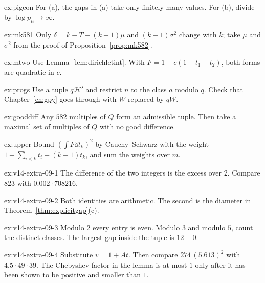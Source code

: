 \begin{hint}{ex:pigeon}
For (a), the gaps in (a) take only finitely many values. For (b), divide by $\log p_n\to\infty$.
\end{hint}

\begin{hint}{ex:mk581}
Only $\delta=k-T-(k-1)\mu$ and $(k-1)\sigma^2$ change with $k$; take $\mu$ and $\sigma^2$ from the proof of Proposition~\ref{prop:mk582}.
\end{hint}

\begin{hint}{ex:mtwo}
Use Lemma~\ref{lem:dirichletint}. With $F=1+c(1-t_1-t_2)$, both forms are quadratic in $c$.
\end{hint}

\begin{hint}{ex:progs}
Use a tuple $q\mathcal H'$ and restrict $n$ to the class $a$ modulo $q$. Check that Chapter~\ref{ch:gpy} goes through with $W$ replaced by $qW$.
\end{hint}

\begin{hint}{ex:gooddiff}
Any $582$ multiples of $Q$ form an admissible tuple. Then take a maximal set of multiples of $Q$ with no good difference.
\end{hint}

\begin{hint}{ex:upper}
Bound $(\int F\dd t_k)^2$ by Cauchy--Schwarz with the weight $1-\sum_{i<k}t_i+(k-1)t_k$, and sum the weights over $m$.
\end{hint}

\begin{hint}{ex:v14-extra-09-1}
The difference of the two integers is the excess over $2$. Compare $823$ with $0.002\cdot708216$.
\end{hint}

\begin{hint}{ex:v14-extra-09-2}
Both identities are arithmetic. The second is the diameter in Theorem~\ref{thm:explicitgap}(c).
\end{hint}

\begin{hint}{ex:v14-extra-09-3}
Modulo $2$ every entry is even. Modulo $3$ and modulo $5$, count the distinct classes. The largest gap inside the tuple is $12-0$.
\end{hint}

\begin{hint}{ex:v14-extra-09-4}
Substitute $v=1+At$. Then compare $274\,(5.613)^2$ with $4.5\cdot49\cdot39$. The Chebyshev factor in the lemma is at most $1$ only after it has been shown to be positive and smaller than $1$.
\end{hint}


